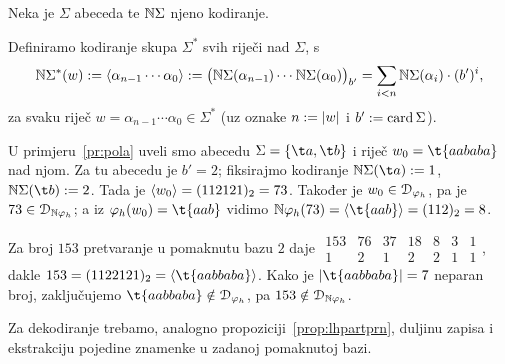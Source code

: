 \begin{definicija}[{name=[kodiranje riječi]}]
Neka je $\Sigma$ abeceda te ${\mathbb N}\Sigma$ njeno kodiranje.

	Definiramo kodiranje skupa $\Sigma^*$ svih riječi nad $\Sigma$, s
\begin{equation}\label{eq:kodNSz}
	{\mathbb N}\Sigma^*(w):=\langle\alpha_{n-1}\dotsm\alpha_0\rangle:=\bigl({\mathbb N}\Sigma(\alpha_{n-1}\mspace{-1mu})\dotsm\mspace{1mu}{\mathbb N}\Sigma(\alpha_0)\bigr)_{b'}=\sum_{i<n}{\mathbb N}\Sigma(\alpha_i)\cdot(b')^i\text,
\end{equation}
za svaku riječ $w=\alpha_{n-1}\dotsm\alpha_0\in\Sigma^*$ (uz oznake $n:=\lvert w\rvert$ i $b':=\operatorname{card}\Sigma$).
\end{definicija}

\begin{primjer}[{name=[prateća funkcija jezične funkcije]}]
U primjeru~\ref{pr:pola} uveli smo abecedu $\Sigma=\{\t a,\t b\}$ i riječ $w_0=\t{aababa}$ nad njom. Za tu abecedu je $b'=2$; fiksirajmo kodiranje $\N\Sigma(\t a):=1$, $\N\Sigma(\t b):=2$. Tada je $\langle w_0\rangle=(112121)_2=73$.
Također je $w_0\in\mathcal D_{\varphi_h}$, pa je $73\in\mathcal D_{{\mathbb N}\varphi_h}$; a iz $\varphi_h(w_0)=\t{aab}$ vidimo $\N\varphi_h(73)=\kr{\t{aab}}=(112)_2=8$.

Za broj $153$ pretvaranje u pomaknutu bazu $2$ daje
$\begin{array}{rrrrrrr}
153 & 76 & 37 & 18 & 8 & 3 & 1\\\hline
1 & 2 & 1 & 2 & 2 & 1 & 1
\end{array}$, dakle $153=(1122121)_2=\kr{\t{aabbaba}}$. Kako je $\dulj{\t{aabbaba}}=7$ neparan broj, zaključujemo $\t{aabbaba}\notin\dom{\varphi_h}$, pa $153\notin\mathcal D_{{\mathbb N}\varphi_h}$.
\end{primjer}

Za dekodiranje trebamo, analogno propoziciji~\ref{prop:lhpartprn}, duljinu zapisa i ekstrakciju pojedine znamenke u zadanoj pomaknutoj bazi. %

